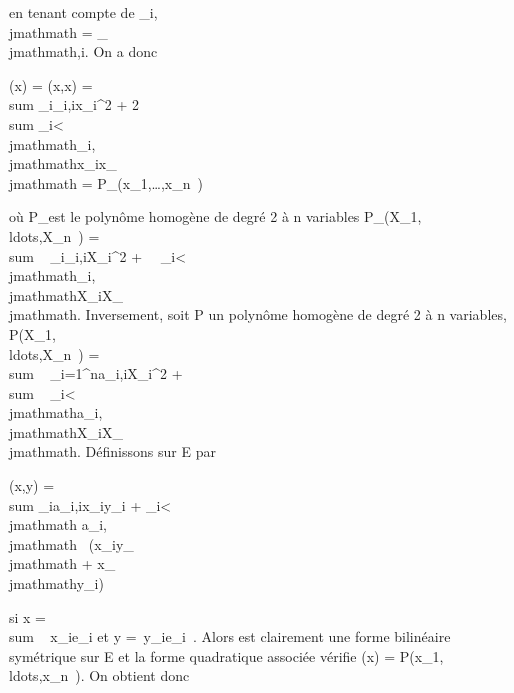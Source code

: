 \documentclass[]{article}
\begin{document}
en tenant compte de \omega_i,\\jmathmath = \omega_\\jmathmath,i. On a donc

\Phi(x) = \phi(x,x) = \\sum
_i\omega_i,ix_i^2 +
2\\sum
_i\textless{}\\jmathmath\omega_i,\\jmathmathx_ix_\\jmathmath =
P_\Phi(x_1,\ldots,x_n~)

où P_\Phi est le polynôme homogène de degré 2 à n variables
P_\Phi(X_1,\\ldots,X_n~)
= \\sum ~
_i\omega_i,iX_i^2 +\
\sum ~
_i\textless{}\\jmathmath\omega_i,\\jmathmathX_iX_\\jmathmath.
Inversement, soit P un polynôme homogène de degré 2 à n variables,
P(X_1,\\ldots,X_n~)
= \\sum ~
_i=1^na_i,iX_i^2
+ \\sum ~
_i\textless{}\\jmathmatha_i,\\jmathmathX_iX_\\jmathmath. Définissons
\phi sur E par

\phi(x,y) = \\sum
_ia_i,ix_iy_i +
\sum _i\textless{}\\jmathmath a_i,\\jmathmath~
 (x_iy_\\jmathmath +
x_\\jmathmathy_i)

si x = \\sum ~
x_ie_i et y =\
\sum  y_ie_i~. Alors \phi est
clairement une forme bilinéaire symétrique sur E et la forme quadratique
associée vérifie \Phi(x) =
P(x_1,\\ldots,x_n~).
On obtient donc
\end{document}
